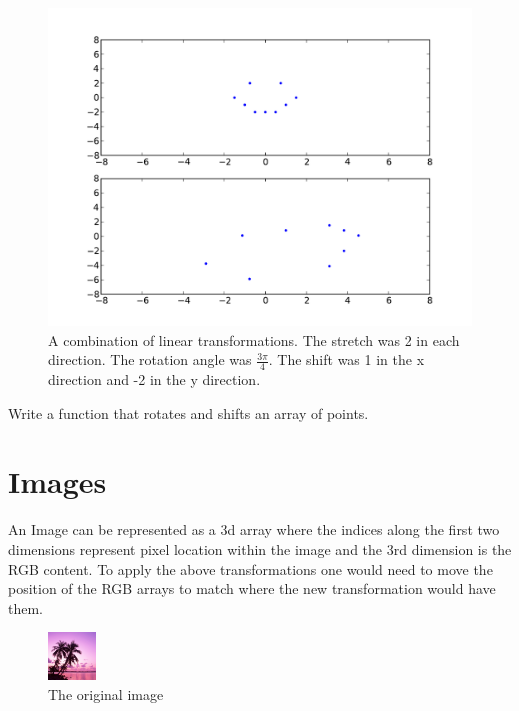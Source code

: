 \begin{figure}[H]
\includegraphics[scale = .5]{combo.pdf}
\caption{
A combination of linear transformations.
The stretch was 2 in each direction.
The rotation angle was $\frac{3\pi}{4}$.
The shift was 1 in the x direction and -2 in the y direction.}
\label{basis:combo}
\end{figure}

\begin{problem}
Write a function that rotates and shifts an array of points.
\end{problem}

\section*{Images}

An Image can be represented as a 3d array where the indices along the first two dimensions represent pixel location within the image and the 3rd dimension is the RGB content.
To apply the above transformations one would need to move the position of the RGB arrays to match where the new transformation would have them.

\begin{figure}[H]
\includegraphics[scale = 2.0]{dream.png}
\caption{The original image}
\end{figure}

